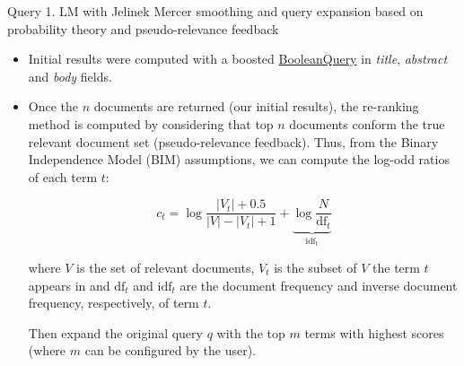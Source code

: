 \documentclass[10pt]{beamer}
\begin{document}
{
\begin{frame}{Query 1. LM with Jelinek Mercer smoothing and query expansion based on probability theory and pseudo-relevance feedback}
    \begin{itemize}
        \item Initial results were computed with a boosted \href{https://lucene.apache.org/core/8_9_0/core/org/apache/lucene/search/BooleanQuery.html}{BooleanQuery} in \textit{title}, \textit{abstract} and \textit{body} fields.
        \item Once the $n$ documents are returned (our initial results), the re-ranking method is computed by considering that top $n$ documents conform the true relevant document set (pseudo-relevance feedback). Thus, from the Binary Independence Model (BIM) assumptions, we can compute the log-odd ratios of each term $t$:
        
        \[ c_t = \log \frac{|V_t| + 0.5}{|V| - |V_t| +1 } + \underbrace{\log \frac{N}{\text{df}_t}}_{\text{idf}_t} \] 

        where $V$ is the set of relevant documents, $V_t$ is the subset of $V$ the term $t$ appears in and  $\text{df}_t$ and $\text{idf}_t$ are the document frequency and inverse document frequency, respectively, of term $t$.
        
        Then expand the original query $q$ with the top $m$ terms with highest scores  (where $m$ can be configured by the user).
    \end{itemize}
\end{frame}

}
\end{document}
